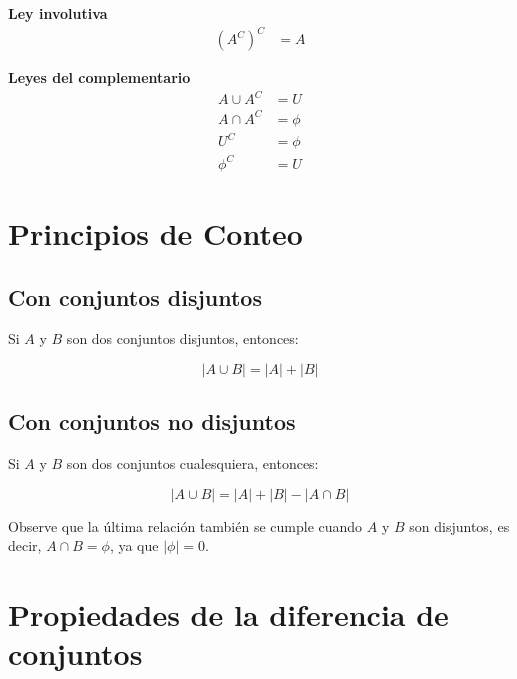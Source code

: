 \documentclass{article}
\begin{document}
\begin{multicols}{2}
        \textbf{Ley involutiva}
        \begin{align}
            (A^C)^C &= A
        \end{align}

        \textbf{Leyes del complementario}
        \begin{subequations}
            \begin{align}
                A \cup A^C &= U\\
                A \cap A^C &= \phi \\
                U^C &= \phi\\
                \phi^C &= U
            \end{align}
        \end{subequations}
        
    \end{multicols}

    \section{Principios de Conteo}

    \subsection{Con conjuntos disjuntos}

    Si $A$ y $B$ son dos conjuntos disjuntos, entonces:

    \begin{equation}
        | A \cup B | = | A | + | B |
    \end{equation}

    \subsection{Con conjuntos no disjuntos}

    Si $A$ y $B$ son dos conjuntos cualesquiera, entonces:

    \begin{equation}
        | A \cup B | = | A | + | B | - | A \cap B |
    \end{equation}

    Observe que la última relación también se cumple cuando $A$ y $B$ son disjuntos, es decir, $A \cap B = \phi$, ya que $|\phi| = 0$.

    \section{Propiedades de la diferencia de conjuntos}
\end{document}
